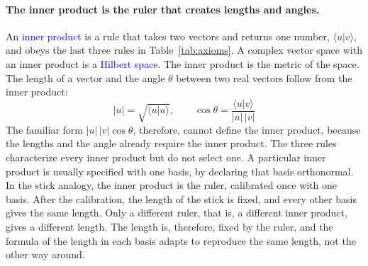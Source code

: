 \paragraph{The inner product is the ruler that creates lengths and angles.} An \textcolor{blue}{inner product} is a rule that takes two vectors and returns one number, $\langle u | v \rangle$, and obeys the last three rules in Table~\ref{tab:axioms}. A complex vector space with an inner product is a \textcolor{blue}{Hilbert space}. The inner product is the metric of the space. The length of a vector and the angle $\theta$ between two real vectors follow from the inner product:
\begin{equation*}
    |u| = \sqrt{\langle u | u \rangle}, \qquad
    \cos\theta = \frac{\langle u | v \rangle}{|u|\, |v|}
\end{equation*}
The familiar form $|u|\, |v| \cos\theta$, therefore, cannot define the inner product, because the lengths and the angle already require the inner product. The three rules characterize every inner product but do not select one. A particular inner product is usually specified with one basis, by declaring that basis orthonormal. In the stick analogy, the inner product is the ruler, calibrated once with one basis. After the calibration, the length of the stick is fixed, and every other basis gives the same length. Only a different ruler, that is, a different inner product, gives a different length. The length is, therefore, fixed by the ruler, and the formula of the length in each basis adapts to reproduce the same length, not the other way around.

